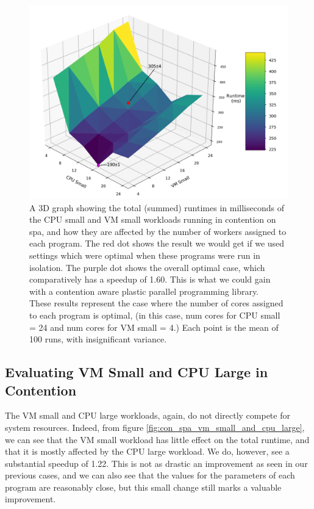 \begin{figure}[H]
    \includegraphics[width=1\textwidth]{graphics/contention/spa/otwc_cpu_small_and_vm_small.png}
    \caption{A 3D graph showing the total (summed) runtimes in milliseconds of the CPU small and VM small workloads running in contention on spa, and how they are affected by the number of workers assigned to each program. The red dot shows the result we would get if we used settings which were optimal when these programs were run in isolation. The purple dot shows the overall optimal case, which comparatively has a speedup of 1.60. This is what we could gain with a contention aware plastic parallel programming library. \\
    These results represent the case where the number of cores assigned to each program is optimal, (in this case, num cores for CPU small = 24 and num cores for VM small = 4.) Each point is the mean of 100 runs, with insignificant variance.}
    \label{fig:con_spa_cpu_small_and_vm_small}
\end{figure}



\subsection{Evaluating VM Small and CPU Large in Contention}
\label{section:results:evaluating_vm_small_and_cpu_large_in_contention}

The VM small and CPU large workloads, again, do not directly compete for system resources. Indeed, from figure \ref{fig:con_spa_vm_small_and_cpu_large}, we can see that the VM small workload has little effect on the total runtime, and that it is mostly affected by the CPU large workload. We do, however, see a substantial speedup of 1.22. This is not as drastic an improvement as seen in our previous cases, and we can also see that the values for the parameters of each program are reasonably close, but this small change still marks a valuable improvement.

